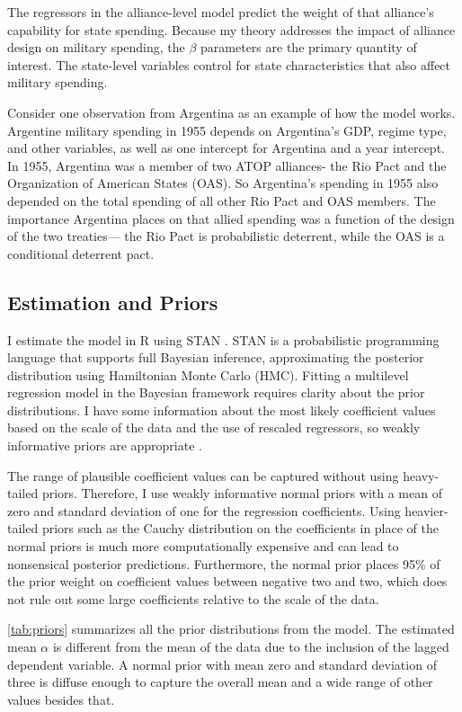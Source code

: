 \documentclass[12pt]{article}
\begin{document}
The regressors in the alliance-level model predict the weight of that alliance's capability for state spending. Because my theory addresses the impact of alliance design on military spending, the $\beta$ parameters are the primary quantity of interest. The state-level variables control for state characteristics that also affect military spending. 

Consider one observation from Argentina as an example of how the model works. Argentine military spending in 1955 depends on Argentina's GDP, regime type, and other variables, as well as one intercept for Argentina and a year intercept. In 1955, Argentina was a member of two ATOP alliances- the Rio Pact and the Organization of American States (OAS). So Argentina's spending in 1955 also depended on the total spending of all other Rio Pact and OAS members. The importance Argentina places on that allied spending was a function of the design of the two treaties--- the Rio Pact is probabilistic deterrent, while the OAS is a conditional deterrent pact. 

\subsection*{Estimation and Priors} 

I estimate the model in \textsf{R} using STAN \citep{Carpenteretal2016}. STAN is a probabilistic programming language that supports full Bayesian inference, approximating the posterior distribution using Hamiltonian Monte Carlo (HMC). Fitting a multilevel regression model in the Bayesian framework requires clarity about the prior distributions. I have some information about the most likely coefficient values based on the scale of the data and the use of rescaled regressors, so weakly informative priors are appropriate \citep{Gelmanetal2014}. 

The range of plausible coefficient values can be captured without using heavy-tailed priors. Therefore, I use weakly informative normal priors with a mean of zero and standard deviation of one for the regression coefficients. Using heavier-tailed priors such as the Cauchy distribution on the coefficients in place of the normal priors is much more computationally expensive and can lead to nonsensical posterior predictions. Furthermore, the normal prior places 95\% of the prior weight on coefficient values between negative two and two, which does not rule out some large coefficients relative to the scale of the data. 

\autoref{tab:priors} summarizes all the prior distributions from the model. The estimated mean $\alpha$ is different from the mean of the data due to the inclusion of the lagged dependent variable. A normal prior with mean zero and standard deviation of three is diffuse enough to capture the overall mean and a wide range of other values besides that. 
\end{document}
